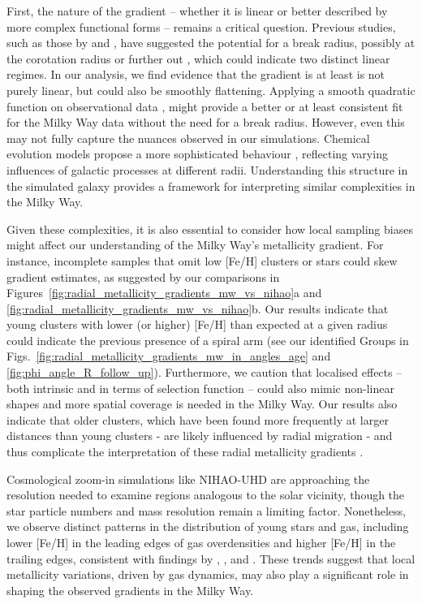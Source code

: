 \documentclass[twocolumn,apj,numberedappendix,appendixfloats,twocolappendix]{openjournal}
\begin{document}
\begin{CJK*}{UTF8}{gbsn}
First, the nature of the gradient -- whether it is linear or better described by more complex functional forms -- remains a critical question. Previous studies, such as those by \citet{Lepine2011} and \citet{Donor2020}, have suggested the potential for a break radius, possibly at the corotation radius or further out \citep{Scarano2013}, which could indicate two distinct linear regimes. In our analysis, we find evidence that the gradient is at least is not purely linear, but could also be smoothly flattening. Applying a smooth quadratic function on observational data \citep{Yong2012, Andrievsky2004, Genovali2014}, might provide a better or at least consistent fit for the Milky Way data without the need for a break radius. However, even this may not fully capture the nuances observed in our simulations. Chemical evolution models propose a more sophisticated behaviour \citep[e.g.][]{Chiappini2001, Kubryk2015, Palla2024}, reflecting varying influences of galactic processes at different radii. Understanding this structure in the simulated galaxy provides a framework for interpreting similar complexities in the Milky Way.

Given these complexities, it is also essential to consider how local sampling biases might affect our understanding of the Milky Way's metallicity gradient. For instance, incomplete samples that omit low [Fe/H] clusters or stars could skew gradient estimates, as suggested by our comparisons in Figures~\ref{fig:radial_metallicity_gradients_mw_vs_nihao}a and \ref{fig:radial_metallicity_gradients_mw_vs_nihao}b. Our results indicate that young clusters with lower (or higher) [Fe/H] than expected at a given radius could indicate the previous presence of a spiral arm (see our identified Groups in Figs.~\ref{fig:radial_metallicity_gradients_mw_in_angles_age} and \ref{fig:phi_angle_R_follow_up}). Furthermore, we caution that localised effects -- both intrinsic and in terms of selection function -- could also mimic non-linear shapes and more spatial coverage is needed in the Milky Way. Our results also indicate that older clusters, which have been found more frequently at larger distances than young clusters - are likely influenced by radial migration - and thus complicate the interpretation of these radial metallicity gradients \citep{Magrini2009, Lepine2011}.

Cosmological zoom-in simulations like NIHAO-UHD are approaching the resolution needed to examine regions analogous to the solar vicinity, though the star particle numbers and mass resolution remain a limiting factor. Nonetheless, we observe distinct patterns in the distribution of young stars and gas, including lower [Fe/H] in the leading edges of gas overdensities and higher [Fe/H] in the trailing edges, consistent with findings by \citet{Grand2016}, \citet{Ho2017c}, and \citet{Kreckel2019}. These trends suggest that local metallicity variations, driven by gas dynamics, may also play a significant role in shaping the observed gradients in the Milky Way.


\end{CJK*}
\end{document}
